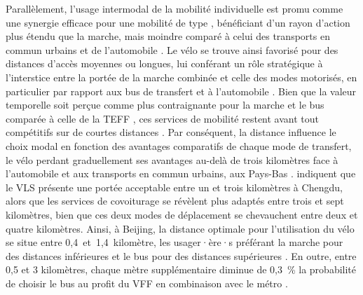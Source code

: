 \begin{refsegment}
Parallèlement, l'usage intermodal de la mobilité individuelle est promu comme une synergie efficace pour une mobilité de type , bénéficiant d'un rayon d'action plus étendu que la marche, mais moindre comparé à celui des transports en commun urbains et de l'automobile \textcolor{blue}{\autocite[1934]{chen_study_2013}}. Le vélo se trouve ainsi favorisé pour des distances d'accès moyennes ou longues, lui conférant un rôle stratégique à l'interstice entre la portée de la marche combinée et celle des modes motorisés, en particulier par rapport aux bus de transfert et à l'automobile \textcolor{blue}{\autocite[1266]{chen_demand_2013}}. Bien que la valeur temporelle soit perçue comme plus contraignante pour la marche et le bus comparée à celle de la \acrshort{TEFF} \textcolor{blue}{\autocite[9]{baek_electric_2021}}, ces services de mobilité restent avant tout compétitifs sur de courtes distances \textcolor{blue}{\autocite[4, 17]{lee_forecasting_2021}}. Par conséquent, la distance influence le choix modal en fonction des avantages comparatifs de chaque mode de transfert, le vélo perdant graduellement ses avantages au-delà de trois kilomètres face à l'automobile et aux transports en commun urbains, aux Pays-Bas \textcolor{blue}{\autocite[359]{givoni_access_2007}}. \textcolor{blue}{\textcite[885]{bi_analysis_2021}} indiquent que le \acrshort{VLS} présente une portée acceptable entre un et trois kilomètres à Chengdu, alors que les services de covoiturage se révèlent plus adaptés entre trois et sept kilomètres, bien que ces deux modes de déplacement se chevauchent entre deux et quatre kilomètres. Ainsi, à Beijing, la distance optimale pour l'utilisation du vélo se situe entre 0,4~et~1,4~kilomètre, les usager·ère·s préférant la marche pour des distances inférieures et le bus pour des distances supérieures \textcolor{blue}{\autocite[5]{wang_interchange_2016}}. En outre, entre 0,5 et 3 kilomètres, chaque mètre supplémentaire diminue de 0,3~\% la probabilité de choisir le bus au profit du \acrshort{VFF} en combinaison avec le métro \textcolor{blue}{\autocite[5]{liu_mode_2022}}.%


\end{refsegment}
